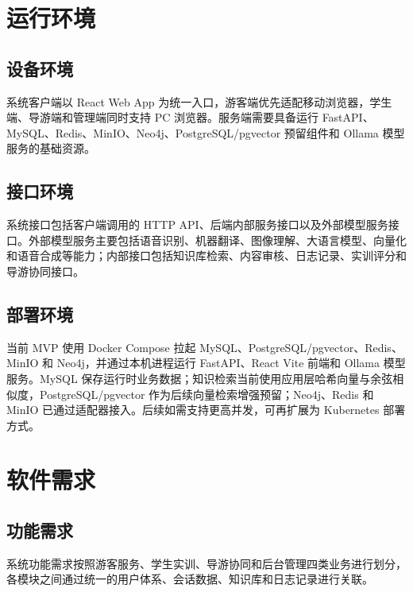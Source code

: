 \section{运行环境}

\subsection{设备环境}

系统客户端以 React Web App 为统一入口，游客端优先适配移动浏览器，学生端、导游端和管理端同时支持 PC 浏览器。服务端需要具备运行 FastAPI、MySQL、Redis、MinIO、Neo4j、PostgreSQL/pgvector 预留组件和 Ollama 模型服务的基础资源。

\subsection{接口环境}

系统接口包括客户端调用的 HTTP API、后端内部服务接口以及外部模型服务接口。外部模型服务主要包括语音识别、机器翻译、图像理解、大语言模型、向量化和语音合成等能力；内部接口包括知识库检索、内容审核、日志记录、实训评分和导游协同接口。

\subsection{部署环境}

当前 MVP 使用 Docker Compose 拉起 MySQL、PostgreSQL/pgvector、Redis、MinIO 和 Neo4j，并通过本机进程运行 FastAPI、React Vite 前端和 Ollama 模型服务。MySQL 保存运行时业务数据；知识检索当前使用应用层哈希向量与余弦相似度，PostgreSQL/pgvector 作为后续向量检索增强预留；Neo4j、Redis 和 MinIO 已通过适配器接入。后续如需支持更高并发，可再扩展为 Kubernetes 部署方式。

\section{软件需求}

\subsection{功能需求}

系统功能需求按照游客服务、学生实训、导游协同和后台管理四类业务进行划分，各模块之间通过统一的用户体系、会话数据、知识库和日志记录进行关联。

